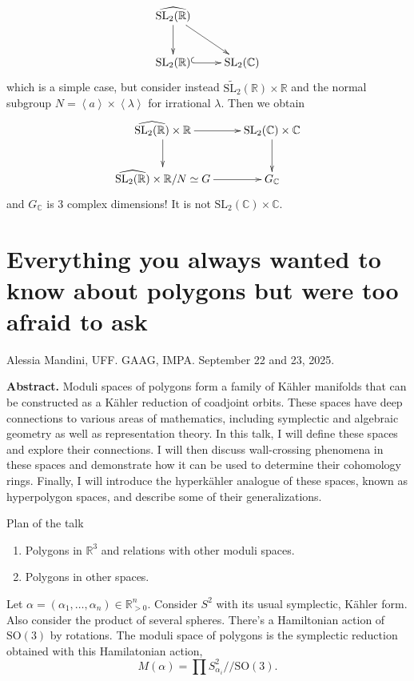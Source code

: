 \begin{example}
\label{example-complexification-groupoid}
$$
\xymatrix{
\widehat{\text{SL}_2(\mathbb{R})}\ar[d]
\ar[dr]\\
\text{SL}_2(\mathbb{R})\ar@{^{(}->}[r]&
\text{SL}_2(\mathbb{C})
}
$$
which is a simple case,
but consider instead
$\tilde{\text{SL}_2}(\mathbb{R})\times
\mathbb{R}$
and the normal subgroup
$N=\left\langle{}a\right\rangle{}\times \left\langle{}\lambda\right\rangle{}$
for irrational $\lambda$.
Then we obtain
$$
\xymatrix{
\widehat{\text{SL}_2(\mathbb{R})}
\times\mathbb{R}\ar[r]\ar[d]
&\text{SL}_2(\mathbb{C})\times\mathbb{C}
\ar[d]\\
\widehat{\text{SL}_2(\mathbb{R})}
\times\mathbb{R}/N\simeq
G\ar[r]&
G_\mathbb{C}
}
$$
and $G_\mathbb{C}$ is 3 complex dimensions!
It is not
$\text{SL}_2(\mathbb{C})\times\mathbb{C}$.
\end{example}

\section{Everything you always wanted to know
about polygons but were too
afraid to ask}
\label{section-every-you-awlwa-wante-know}

\noindent
Alessia Mandini, UFF.
GAAG, IMPA.
September 22 and 23, 2025.

\medskip\noindent
{\bf Abstract.} Moduli spaces of polygons
form a family of Kähler
manifolds that can be constructed as a Kähler
reduction of coadjoint orbits.
These spaces have deep connections to various
areas of mathematics, including
symplectic and algebraic geometry as well as
representation theory. In this
talk, I will define these spaces and explore
their connections. I will then
discuss wall-crossing phenomena in these
spaces and demonstrate how it can be
used to determine their cohomology rings.
Finally, I will introduce the
hyperkähler analogue of these spaces, known
as hyperpolygon spaces, and describe
some of their generalizations.

\medskip\noindent



Plan of the talk
\begin{enumerate}
\item Polygons in $\mathbb{R}^3$ and
relations with
other moduli spaces.
\item Polygons in other spaces.
\end{enumerate}

Let $\alpha=(\alpha_1,\ldots,\alpha_n)\in
\mathbb{R}^n_{>0}$.
Consider $S^2$ with its usual symplectic,
Kähler form.
Also consider the product of several spheres.
There's a Hamiltonian action of
$\text{SO}(3)$ by rotations.
The moduli space of polygons is
the symplectic reduction obtained with this
Hamilatonian action,
$$
M(\alpha)=\prod
S^2_{\alpha_i}/\!/\text{SO}(3).
$$


